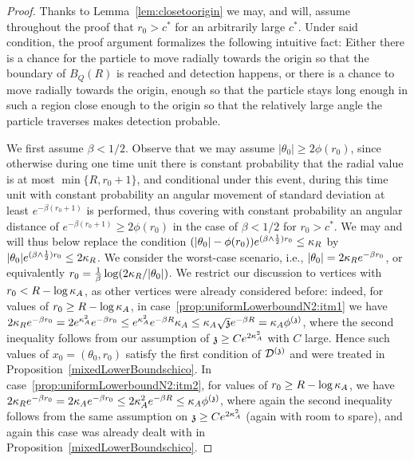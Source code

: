 \begin{proof}
Thanks to Lemma~\ref{lem:closetoorigin} we may, and will, assume throughout the proof that
$r_0>c^*$ for an arbitrarily large $c^*$. Under said condition, the proof argument formalizes the following intuitive fact: Either there is a chance for the particle to move radially towards the origin so that the boundary of $B_Q(R)$ is reached and detection happens, or there is a chance to move radially towards the origin, enough so that the particle stays long enough in such a region close enough to the origin so that the relatively large angle the particle traverses makes detection probable.

We first assume $\beta<1/2$.
Observe that we may assume $|\theta_0|\ge 2\phi(r_0)$, since otherwise during one time unit there is constant probability that the radial value is at most $\min\{R,r_0+1\}$, and conditional under this event, during this time unit with constant probability an angular movement of standard deviation at least $e^{-\beta (r_0+1)}$ is performed, thus covering with constant probability an angular distance of $e^{-\beta(r_0+1)} \ge 2\phi(r_0)$ in the case of $\beta < 1/2$ for $r_0 > c^*$. We may and will thus below replace the condition $(|\theta_0|-\phi(r_0))e^{(\beta\wedge\frac12)r_0} \le \kappa_R$ by $|\theta_0|e^{(\beta\wedge\frac12)r_0} \le 2\kappa_R$. We consider the worst-case scenario, i.e., $|\theta_0|=2\kappa_R e^{-\beta r_0}$, or equivalently $r_0=\frac{1}{\beta}\log(2\kappa_R/|\theta_0|)$. %
We restrict our discussion to vertices with $r_0 < R-\log \kappa_A$, as other vertices were already considered before: indeed, for values of $r_0 \ge R-\log \kappa_A$, in case~\eqref{prop:uniformLowerboundN2:itm1}
we have $2\kappa_R e^{-\beta r_0} = 2e^{\kappa_A^2}e^{-\beta r_0} \le e^{\kappa_A^2}e^{-\beta R}\kappa_A \le \kappa_A \sqrt{\mathfrak{z}}e^{-\beta R}=\kappa_A \phi^{(\mathfrak{z})}$, where the second inequality follows from our assumption of $\mathfrak{z}\ge Ce^{2\kappa_A^2}$ with $C$ large. Hence such values of $x_0=(\theta_0, r_0)$ satisfy the first condition of $\mathcal{D}^{(\mathfrak{z})}$ and were treated in Proposition~\ref{mixedLowerBoundschico}. In case~\eqref{prop:uniformLowerboundN2:itm2}, for values of $r_0 \ge R-\log \kappa_A$, we have $2\kappa_R e^{-\beta r_0}=2\kappa_A e^{-\beta r_0}\le 2\kappa_A^2 e^{-\beta R}\le \kappa_A \phi^{(\mathfrak{z})}$, where again the second inequality follows from the same assumption on $\mathfrak{z} \ge Ce^{2\kappa_A^2}$ (again with room to spare), and again this case was already dealt with in Proposition~\ref{mixedLowerBoundschico}.

\end{proof}
